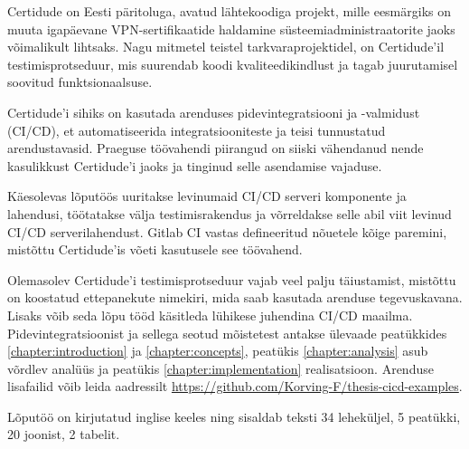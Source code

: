 Certidude on Eesti päritoluga, avatud lähtekoodiga projekt, mille
eesmärgiks on muuta igapäevane VPN-sertifikaatide haldamine 
süsteemiadministraatorite jaoks võimalikult lihtsaks. Nagu
mitmetel teistel tarkvaraprojektidel, on Certidude’il testimisprotseduur,
mis suurendab koodi kvaliteedikindlust ja tagab juurutamisel soovitud
funktsionaalsuse. 

Certidude'i sihiks on kasutada arenduses pidevintegratsiooni  ja
-valmidust (CI/CD), et automatiseerida integratsiooniteste ja teisi
tunnustatud arendustavasid. Praeguse töövahendi piirangud on siiski
vähendanud nende kasulikkust Certidude’i jaoks ja tinginud selle
asendamise vajaduse.

Käesolevas lõputöös uuritakse levinumaid CI/CD serveri komponente ja
lahendusi, töötatakse välja testimisrakendus ja võrreldakse selle abil
viit levinud CI/CD serverilahendust. Gitlab CI vastas defineeritud
nõuetele kõige paremini, mistõttu Certidude’is võeti kasutusele see
töövahend.

Olemasolev Certidude’i testimisprotseduur vajab veel palju täiustamist,
mistõttu on koostatud ettepanekute nimekiri, mida saab kasutada arenduse
tegevuskavana. Lisaks võib seda lõpu tööd käsitleda lühikese juhendina
CI/CD maailma. Pidevintegratsioonist ja sellega seotud mõistetest
antakse ülevaade peatükkides \ref{chapter:introduction} ja \ref{chapter:concepts}, peatükis \ref{chapter:analysis} asub võrdlev analüüs ja
peatükis \ref{chapter:implementation} realisatsioon. Arenduse lisafailid võib leida  aadressilt 
\url{https://github.com/Korving-F/thesis-cicd-examples}.

Lõputöö on kirjutatud inglise keeles ning sisaldab teksti 34 leheküljel, 5 peatükki, 20 joonist, 2 tabelit.